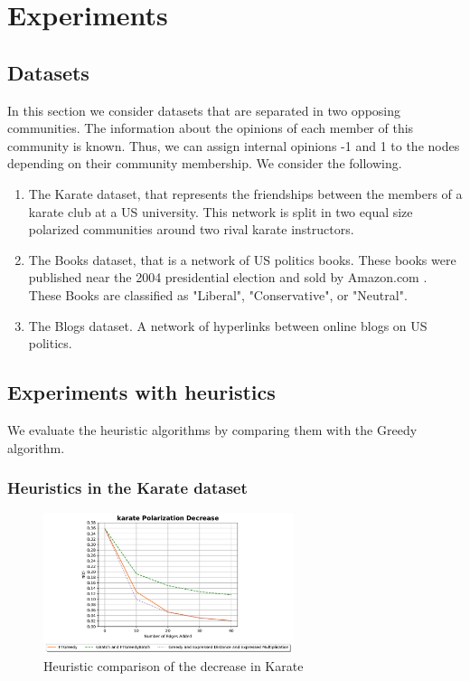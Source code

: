 \chapter{Experiments}
\label{ch:experiments}

\section{Datasets}
\label{sec:ds}

In this section we consider datasets that are separated in two opposing communities. The information about the opinions of each member of this community is known. Thus, we can assign internal opinions -1 and 1 to the nodes depending on their community membership\cite{tsapMatakosTerzi}.  We consider the following.

\begin{enumerate}

  \item The Karate dataset, that represents the friendships between the members of a karate club at a US university. This network is split in two equal size polarized communities around two rival karate instructors.
  
  \item The Books dataset, that is a network of US politics books. These books were published near the 2004 presidential election and sold by Amazon.com . These Books are classified as "Liberal", "Conservative", or "Neutral".
  
  \item The Blogs dataset. A network of hyperlinks between online blogs on US politics.
  
\end{enumerate}
\section{Experiments with heuristics}
\label{sec:experimHeuristics}

 We evaluate the heuristic algorithms by comparing them with the Greedy  algorithm. 

 \clearpage

\subsection{Heuristics in the Karate dataset}

\begin{figure}[!htbp]
	\centering
	\includegraphics[width=0.65\textwidth]{Figures/Karate Polarization Decrease}
	\caption{Heuristic comparison of the decrease in Karate}
	\label{fig:karate_pol}
\end{figure}


